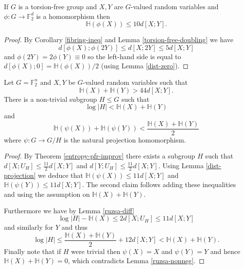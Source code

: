 \begin{lemma}\label{torsion-dist-shrinking}\leanok
If $G$ is a torsion-free group and $X,Y$ are $G$-valued random variables and $\phi:G\to \mathbb{F}_2^d$ is a homomorphism then
\[\mathbb{H}(\phi(X))\leq 10d[X;Y].\]
\end{lemma}
\begin{proof}
By Corollary \ref{fibring-ineq} and Lemma \ref{torsion-free-doubling} we have
\[d[\phi(X);\phi(2Y)]\leq d[X;2Y]\leq 5d[X;Y]\]
and $\phi(2Y)=2\phi(Y)\equiv 0$ so the left-hand side is equal to $d[\phi(X);0]=\mathbb{H}(\phi(X))/2$ (using Lemma \ref{dist-zero}).
\end{proof}

\begin{lemma}\label{app-ent-pfr}\leanok
Let $G=\mathbb{F}_2^n$ and $X,Y$ be $G$-valued random variables such that
\[\mathbb{H}(X)+\mathbb{H}(Y)> 44d[X;Y].\]
There is a non-trivial subgroup $H\leq G$ such that
\[\log \lvert H\rvert <\mathbb{H}(X)+\mathbb{H}(Y)\] and
\[\mathbb{H}(\psi(X))+\mathbb{H}(\psi(Y))< \frac{\mathbb{H}(X)+\mathbb{H}(Y)}{2}\]
where $\psi:G\to G/H$ is the natural projection homomorphism.
\end{lemma}
\begin{proof}
By Theorem \ref{entropy-pfr-improv} there exists a subgroup $H$ such that $d[X;U_H]\leq \frac{11}{2} d[X;Y]$ and $d[Y;U_H]\leq \frac{11}{2} d[X;Y]$. Using Lemma \ref{dist-projection} we deduce that $\mathbb{H}(\psi(X))\leq 11 d[X;Y]$ and $\mathbb{H}(\psi(Y))\leq 11d[X;Y]$. The second claim follows adding these inequalities and using the assumption on $\mathbb{H}(X)+\mathbb{H}(Y)$.

Furthermore we have by Lemma \ref{ruzsa-diff}
\[\log \lvert H \rvert-\mathbb{H}(X)\leq 2d[X;U_H]\leq 11d[X;Y]\]
and similarly for $Y$ and thus
\[\log \lvert  H\rvert \leq \frac{\mathbb{H}(X)+\mathbb{H}(Y)}{2}+12d[X;Y]< \mathbb{H}(X)+\mathbb{H}(Y).\]
Finally note that if $H$ were trivial then $\psi(X)=X$ and $\psi(Y)=Y$ and hence $\mathbb{H}(X)+\mathbb{H}(Y)=0$, which contradicts Lemma \ref{ruzsa-nonneg}.
\end{proof}


